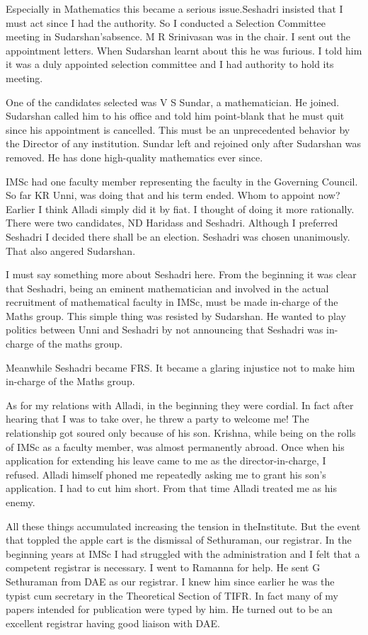Especially in Mathematics this became a serious issue.\break Seshadri insisted 
that I must act since I had the authority. So I conducted a Selection 
Committee meeting in Sudarshan's\break absence. M R Srinivasan was in the 
chair. I sent out the appointment letters. When Sudarshan learnt about 
this he was furious. I told him it was a duly appointed selection 
committee and I had authority to hold its meeting.

One of the candidates selected was V S Sundar, a mathematician. He 
joined. Sudarshan called him to his office and told him point-blank that 
he must quit since his appointment is cancelled. This must be an 
unprecedented behavior by the Director of any institution. Sundar left 
and rejoined only after Sudarshan was removed. He has done high-quality 
mathematics ever since.

IMSc had one faculty member representing the faculty in the Governing 
Council. So far KR Unni, was doing that and his term ended. Whom to 
appoint now? Earlier I think Alladi simply did it by fiat. I thought of 
doing it more rationally. There were two candidates, ND Haridass and 
Seshadri. Although I preferred Seshadri I decided there shall be an 
election. Seshadri was chosen unanimously. That also angered Sudarshan.

I must say something more about Seshadri here. From the beginning it was 
clear that Seshadri, being an eminent mathematician and involved in the 
actual recruitment of mathematical faculty in IMSc, must be made 
in-charge of the Maths group. This simple thing was resisted by 
Sudarshan. He wanted to play politics between Unni and Seshadri by not 
announcing that Seshadri was in-charge of the maths group.

Meanwhile Seshadri became FRS. It became a glaring injustice not to make 
him in-charge of the Maths group.

As for my relations with Alladi, in the beginning they were cordial. 
In fact after hearing that I was to take over, he threw a party to 
welcome me! The relationship got soured only because of his son. 
Krishna, while being on the rolls of IMSc as a faculty member, was 
almost permanently abroad. Once when his application for extending his 
leave came to me as the director-in-charge, I refused. Alladi himself 
phoned me repeatedly asking me to grant his son's application. I had to 
cut him short. From that time Alladi treated me as his enemy.
 
All these things accumulated increasing the tension in the\break Institute. 
But the event that toppled the apple cart is the dismissal of 
Sethuraman, our registrar. In the beginning years at IMSc I had 
struggled with the administration and I felt that a competent registrar 
is necessary. I went to Ramanna for help. He sent G Sethuraman from DAE 
as our registrar. I knew him since earlier he was the typist cum 
secretary in the Theoretical Section of TIFR. In fact many of my papers 
intended for publication were typed by him. He turned out to be an 
excellent registrar having good liaison with DAE.

